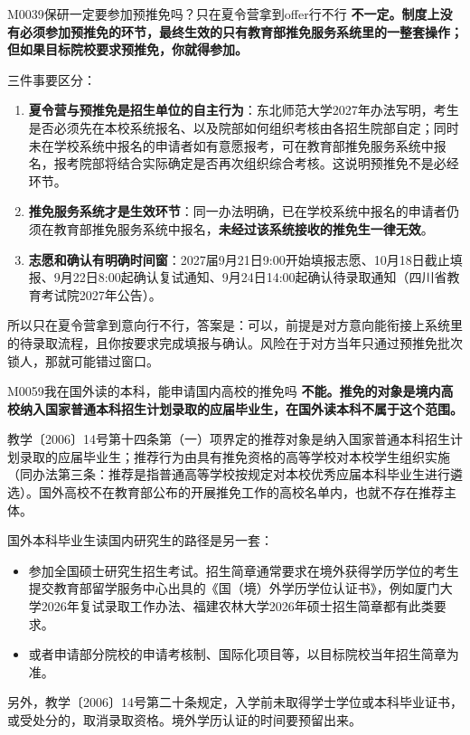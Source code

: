 \begin{qa}{M0039}{保研一定要参加预推免吗？只在夏令营拿到offer行不行}
\textbf{不一定。制度上没有必须参加预推免的环节，最终生效的只有教育部推免服务系统里的一整套操作；但如果目标院校要求预推免，你就得参加。}

三件事要区分：

\begin{enumerate}
  \item \textbf{夏令营与预推免是招生单位的自主行为}：东北师范大学2027年办法写明，考生是否必须先在本校系统报名、以及院部如何组织考核由各招生院部自定；同时未在学校系统中报名的申请者如有意愿报考，可在教育部推免服务系统中报名，报考院部将结合实际确定是否再次组织综合考核。这说明预推免不是必经环节。
  \item \textbf{推免服务系统才是生效环节}：同一办法明确，已在学校系统中报名的申请者仍须在教育部推免服务系统中报名，\textbf{未经过该系统接收的推免生一律无效}。
  \item \textbf{志愿和确认有明确时间窗}：2027届9月21日9:00开始填报志愿、10月18日截止填报、9月22日8:00起确认复试通知、9月24日14:00起确认待录取通知（四川省教育考试院2027年公告）。
\end{enumerate}

所以只在夏令营拿到意向行不行，答案是：可以，前提是对方意向能衔接上系统里的待录取流程，且你按要求完成填报与确认。风险在于对方当年只通过预推免批次锁人，那就可能错过窗口。
\end{qa}

\begin{qa}{M0059}{我在国外读的本科，能申请国内高校的推免吗}
\textbf{不能。推免的对象是境内高校纳入国家普通本科招生计划录取的应届毕业生，在国外读本科不属于这个范围。}

教学〔2006〕14号第十四条第（一）项界定的推荐对象是纳入国家普通本科招生计划录取的应届毕业生；推荐行为由具有推免资格的高等学校对本校学生组织实施（同办法第三条：推荐是指普通高等学校按规定对本校优秀应届本科毕业生进行遴选）。国外高校不在教育部公布的开展推免工作的高校名单内，也就不存在推荐主体。

国外本科毕业生读国内研究生的路径是另一套：

\begin{itemize}
  \item 参加全国硕士研究生招生考试。招生简章通常要求在境外获得学历学位的考生提交教育部留学服务中心出具的《国（境）外学历学位认证书》，例如厦门大学2026年复试录取工作办法、福建农林大学2026年硕士招生简章都有此类要求。
  \item 或者申请部分院校的申请考核制、国际化项目等，以目标院校当年招生简章为准。
\end{itemize}

另外，教学〔2006〕14号第二十条规定，入学前未取得学士学位或本科毕业证书，或受处分的，取消录取资格。境外学历认证的时间要预留出来。
\end{qa}

